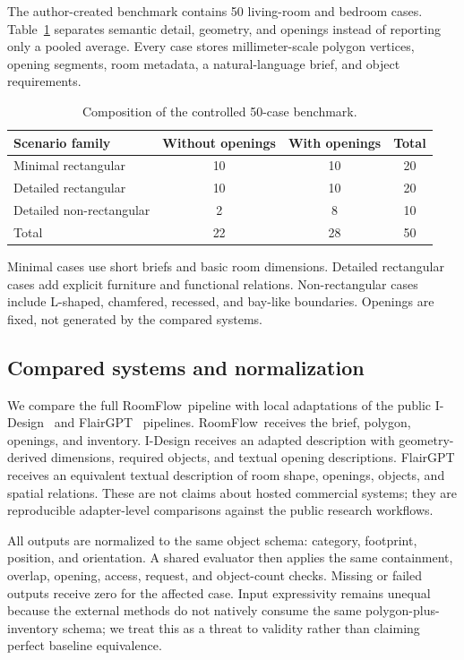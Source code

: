 \documentclass[pdflatex,sn-mathphys-num]{sn-jnl}
\newcommand{\method}{RoomFlow}
\begin{document}
The author-created benchmark contains 50 living-room and bedroom cases. Table~\ref{tab:benchmark} separates semantic detail, geometry, and openings instead of reporting only a pooled average. Every case stores millimeter-scale polygon vertices, opening segments, room metadata, a natural-language brief, and object requirements.

\begin{table}[!t]
  \caption{Composition of the controlled 50-case benchmark.}\label{tab:benchmark}
  \centering
  \begin{tabular}{@{}lccc@{}}
    \toprule
    Scenario family & Without openings & With openings & Total \\
    \midrule
    Minimal rectangular & 10 & 10 & 20 \\
    Detailed rectangular & 10 & 10 & 20 \\
    Detailed non-rectangular & 2 & 8 & 10 \\
    \midrule
    Total & 22 & 28 & 50 \\
    \bottomrule
  \end{tabular}
\end{table}

Minimal cases use short briefs and basic room dimensions. Detailed rectangular cases add explicit furniture and functional relations. Non-rectangular cases include L-shaped, chamfered, recessed, and bay-like boundaries. Openings are fixed, not generated by the compared systems.

\subsection{Compared systems and normalization}

We compare the full \method\ pipeline with local adaptations of the public I-Design~\cite{celen2024idesign} and FlairGPT~\cite{littlefair2025flairgpt} pipelines. \method\ receives the brief, polygon, openings, and inventory. I-Design receives an adapted description with geometry-derived dimensions, required objects, and textual opening descriptions. FlairGPT receives an equivalent textual description of room shape, openings, objects, and spatial relations. These are not claims about hosted commercial systems; they are reproducible adapter-level comparisons against the public research workflows.

All outputs are normalized to the same object schema: category, footprint, position, and orientation. A shared evaluator then applies the same containment, overlap, opening, access, request, and object-count checks. Missing or failed outputs receive zero for the affected case. Input expressivity remains unequal because the external methods do not natively consume the same polygon-plus-inventory schema; we treat this as a threat to validity rather than claiming perfect baseline equivalence.
\end{document}
